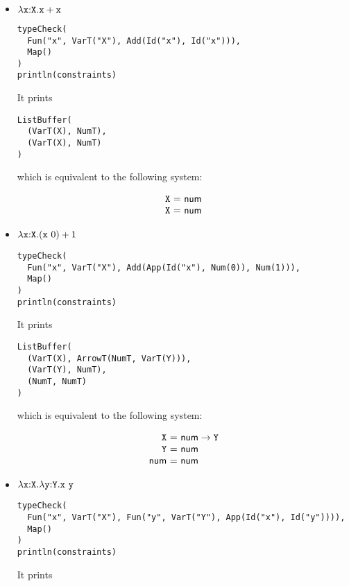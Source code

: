 \begin{itemize}
\item $\lambda\texttt{x}{:}\texttt{X}.\texttt{x}+\texttt{x}$

\begin{verbatim}
typeCheck(
  Fun("x", VarT("X"), Add(Id("x"), Id("x"))),
  Map()
)
println(constraints)
\end{verbatim}

It prints

\begin{verbatim}
ListBuffer(
  (VarT(X), NumT),
  (VarT(X), NumT)
)
\end{verbatim}

which is equivalent to the following system:

\[
\begin{array}{r@{~}c@{~}l}
  \cX &=& \tnum \\
  \cX &=& \tnum \\
\end{array}
\]

\item $\lambda\texttt{x}{:}\texttt{X}.(\texttt{x}\ 0)+1$

\begin{verbatim}
typeCheck(
  Fun("x", VarT("X"), Add(App(Id("x"), Num(0)), Num(1))),
  Map()
)
println(constraints)
\end{verbatim}

It prints

\begin{verbatim}
ListBuffer(
  (VarT(X), ArrowT(NumT, VarT(Y))),
  (VarT(Y), NumT),
  (NumT, NumT)
)
\end{verbatim}

which is equivalent to the following system:

\[
\begin{array}{r@{~}c@{~}l}
  \cX &=& \tarrow{\tnum}{\cY} \\
  \cY &=& \tnum \\
  \tnum &=& \tnum \\
\end{array}
\]

\item $\lambda\texttt{x}{:}\texttt{X}.\lambda\texttt{y}{:}\texttt{Y}.\texttt{x}\ \texttt{y}$

\begin{verbatim}
typeCheck(
  Fun("x", VarT("X"), Fun("y", VarT("Y"), App(Id("x"), Id("y")))),
  Map()
)
println(constraints)
\end{verbatim}

It prints


\end{itemize}
